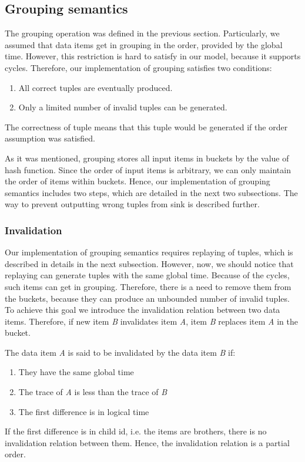 
\label  {fs-implementation-section}

\subsection{Grouping semantics}
The grouping operation was defined in the previous section. Particularly, we assumed that data items get in grouping in the order, provided by the global time. However, this restriction is hard to satisfy in our model, because it supports cycles. Therefore, our implementation of grouping satisfies two conditions:

\begin{enumerate}
\item All correct tuples are eventually produced.
\item Only a limited number of invalid tuples can be generated.
\end{enumerate}

The correctness of tuple means that this tuple would be generated if the order assumption was satisfied. 

As it was mentioned, grouping stores all input items in buckets by the value of hash function. Since the order of input items is arbitrary, we can only maintain the order of items within buckets. Hence, our implementation of grouping semantics includes two steps, which are detailed in the next two subsections. The way to prevent outputting wrong tuples from sink is described further.

\subsubsection{Invalidation}
Our implementation of grouping semantics requires replaying of tuples, which is described in details in the next subsection. However, now, we should notice that replaying can generate tuples with the same global time. Because of the cycles, such items can get in grouping. Therefore, there is a need to remove them from the buckets, because they can produce an unbounded number of invalid tuples. To achieve this goal we introduce the invalidation relation between two data items. Therefore, if new item {\it B} invalidates item {\it A}, item {\it B} replaces item {\it A} in the bucket.

The data item {\it A} is said to be invalidated by the data item {\it B} if:
\begin{enumerate}
\item They have the same global time
\item The trace of {\it A} is less than the trace of {\it B}
\item The first difference is in logical time
\end{enumerate}
If the first difference is in child id, i.e. the items are brothers, there is no invalidation relation between them. Hence, the invalidation relation is a partial order.

